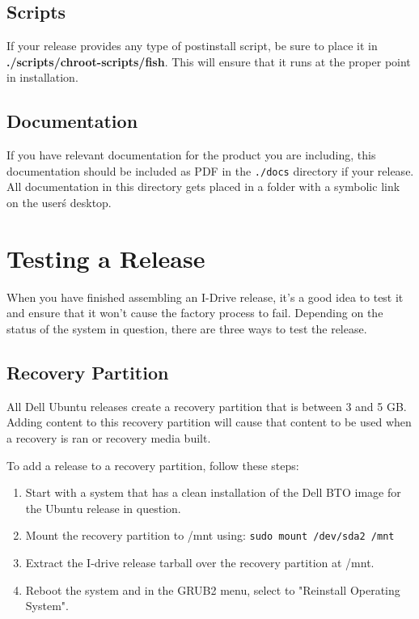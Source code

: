 \documentclass[letterpaper,10pt,titlepage]{article}
\begin{document}
\subsection{Scripts}
If your release provides any type of postinstall script, be sure to place it in \textbf{./scripts/chroot-scripts/fish}.  This will ensure that it runs at the proper point in installation.

\subsection{Documentation}
If you have relevant documentation for the product you are including, this documentation should be included as PDF in the \texttt{./docs} directory if your release.  All documentation in this directory gets placed in a folder with a symbolic link on the user\'s desktop.

\section{Testing a Release}
When you have finished assembling an I-Drive release, it's a good idea to test it and ensure that it won't cause the factory process to fail.  Depending on the status of the system in question, there are three ways to test the release.

\subsection{Recovery Partition}
All Dell Ubuntu releases create a recovery partition that is between 3 and 5 GB.  Adding content to this recovery partition will cause that content to be used when a recovery is ran or recovery media built.

To add a release to a recovery partition, follow these steps:
\begin{enumerate}
\item Start with a system that has a clean installation of the Dell BTO image for the Ubuntu release in question.
\item Mount the recovery partition to /mnt using: \texttt{sudo mount /dev/sda2 /mnt}
\item Extract the I-drive release tarball over the recovery partition at /mnt.
\item Reboot the system and in the GRUB2 menu, select to "Reinstall Operating System".
\end{enumerate}
\end{document}
